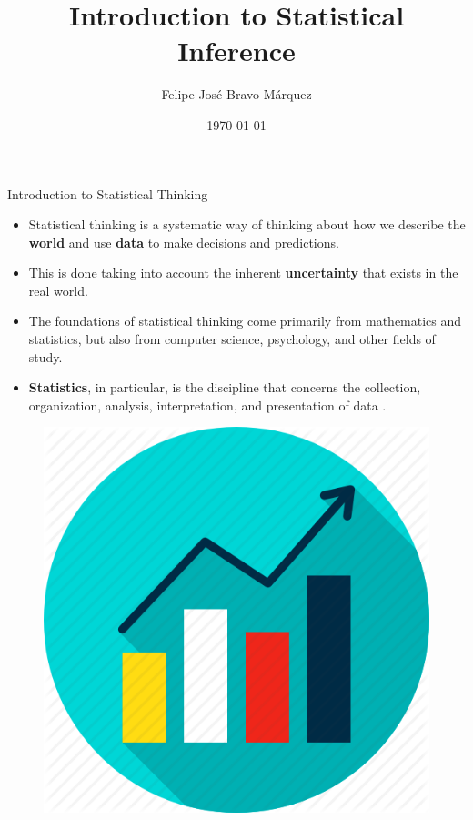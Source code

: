 \documentclass[handout]{beamer}
\title{Introduction to Statistical Inference}
\author[Felipe Bravo Márquez]{\footnotesize
 \textcolor[rgb]{0.00,0.00,1.00}{Felipe José Bravo Márquez}}
\date{ \today }
\begin{document}
\begin{frame}
\titlepage


\end{frame}




\begin{frame}{Introduction to Statistical Thinking}
\scriptsize{
\begin{itemize}
\item Statistical thinking is a systematic way of thinking about how we describe the \textbf{world} and use \textbf{data} to make decisions and predictions.

\item This is done taking into account the inherent \textbf{uncertainty} that exists in the real world.  \cite{poldrack2019statistical}

 
 \item The foundations of statistical thinking come primarily from mathematics and statistics, but also from computer science, psychology, and other fields of study. \cite{poldrack2019statistical}
 
 \item \textbf{Statistics}, in particular, is the discipline that concerns the collection, organization, analysis, interpretation, and presentation of data \cite{wiki:Statistics}.
 
\end{itemize}

\begin{figure}[h!]
	\centering
	\includegraphics[scale=0.2]{pics/stats.png}
\end{figure}

} 
\end{frame}
\end{document}
